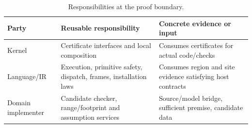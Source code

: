 \begin{table}[t]
\caption{Responsibilities at the proof boundary.}
\label{tab:responsibilities}
\centering\small
\begin{tabular}{>{\raggedright\arraybackslash}p{}
  >{\raggedright\arraybackslash}p{}
  >{\raggedright\arraybackslash}p{}}
\toprule
Party&Reusable responsibility&Concrete evidence or input\\
\midrule
Kernel&Certificate interfaces and local composition&Consumes certificates for actual code/checks\\
Language/IR&Execution, primitive safety, dispatch, frames, installation laws&Consumes region and site evidence satisfying host contracts\\
Domain implementer&Candidate checker, range/footprint and assumption services&Source/model bridge, sufficient premise, candidate data\\
\bottomrule
\end{tabular}
\end{table}
